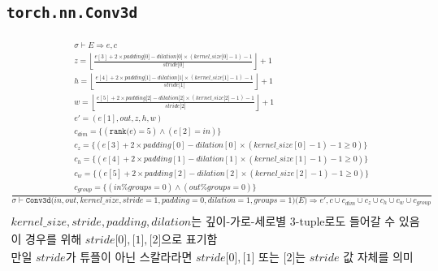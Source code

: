 \documentclass{article}
\newcommand{\x}{\times}
\newcommand{\rem}{\mtt{\%}}
\newcommand{\Rar}{\Rightarrow}
\newcommand{\ttt}[1]{\texttt{#1}}
\newcommand{\mtt}[1]{\mathtt{#1}}
\newcommand{\op}[2]{\mtt{#1(}#2\mtt{)}}
\newcommand{\module}[3]{\mtt{#1(}#2\mtt{)(}#3\mtt{)}}
\newcommand{\ind}[1]{\mtt{[}#1\mtt{]}}
\begin{document}
\subsection*{\ttt{torch.nn.Conv3d}}%
\begin{align*}
  \frac
  {
    \begin{array}{l}
      \sigma \vdash E \Rar e, c \\
      z = \left\lfloor \frac{e[3] + 2 \x padding \ind{0} - dilation \ind{0}
        \x (kernel\_size \ind{0} - 1) - 1}{stride \ind{0}} \right\rfloor + 1 \\
      h = \left\lfloor \frac{e[4] + 2 \x padding \ind{1} - dilation \ind{1}
        \x (kernel\_size \ind{1} - 1) - 1}{stride \ind{1}} \right\rfloor + 1 \\
      w = \left\lfloor \frac{e[5] + 2 \x padding \ind{2} - dilation \ind{2}
        \x (kernel\_size \ind{2} - 1) - 1}{stride \ind{2}} \right\rfloor + 1 \\
      e' = (e[1], out, z, h, w) \\
      c_{dim} = \{ (\op{rank}{e} = 5) \land (e[2] = in) \} \\
      c_z = \{ (e[3] + 2 \x padding[0] - dilation[0] \x (kernel\_size[0] - 1) -
      1 \geq 0) \}\\
      c_h = \{ (e[4] + 2 \x padding[1] - dilation[1] \x (kernel\_size[1] - 1) -
      1 \geq 0) \}\\
      c_w = \{ (e[5] + 2 \x padding[2] - dilation[2] \x (kernel\_size[2] - 1) -
      1 \geq 0) \}\\
      c_{group} = \{ (in \rem groups = 0) \land (out \rem groups = 0) \}
    \end{array}
  }
  {
    \sigma \vdash \module{Conv3d}{in, out, kernel\_size, stride=1, padding=0,
      dilation=1, groups=1}{E} \Rar e', c \cup c_{dim} \cup c_z \cup c_h \cup
      c_w \cup c_{group}
  } \\
  \\
  \text{$kernel\_size, stride, padding, dilation$는 깊이-가로-세로별 3-tuple로도
  들어갈 수 있음} \\
  \text{이 경우를 위해 $stride\ind{0}, \ind{1}, \ind{2}$으로 표기함} \\
  \text{만일 $stride$가 튜플이 아닌 스칼라라면 $stride\ind{0}, \ind{1}$ 또는 
  $\ind{2}$는 $stride$ 값 자체를 의미}
\end{align*}
\end{document}
